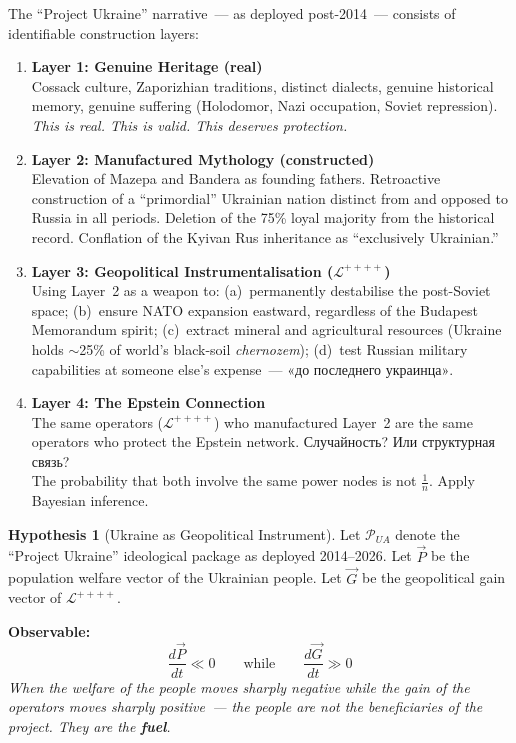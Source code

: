 \documentclass[11pt,a4paper]{article}
\theoremstyle{definition}
\newtheorem{hypothesis}[theorem]{Hypothesis}
\theoremstyle{remark}
\newcommand{\LondonOp}{\mathcal{L}^{++++}}  %
\newcommand{\UkrProject}{\mathcal{P}_{UA}}  %
\begin{document}
\begin{scibox}
The ``Project Ukraine'' narrative~--- as deployed post-2014~---
consists of identifiable construction layers:

\begin{enumerate}[leftmargin=1.5cm, itemsep=6pt]
  \item \textbf{Layer 1: Genuine Heritage (real)}\\
    Cossack culture, Zaporizhian traditions, distinct dialects,
    genuine historical memory, genuine suffering
    (Holodomor, Nazi occupation, Soviet repression).
    \textit{This is real. This is valid. This deserves protection.}

  \item \textbf{Layer 2: Manufactured Mythology (constructed)}\\
    Elevation of Mazepa and Bandera as founding fathers.
    Retroactive construction of a ``primordial'' Ukrainian nation
    distinct from and opposed to Russia in all periods.
    Deletion of the 75\% loyal majority from the historical record.
    Conflation of the Kyivan Rus inheritance as ``exclusively Ukrainian.''

  \item \textbf{Layer 3: Geopolitical Instrumentalisation ($\LondonOp$)}\\
    Using Layer~2 as a weapon to:
    (a)~permanently destabilise the post-Soviet space;
    (b)~ensure NATO expansion eastward, regardless of
    the Budapest Memorandum spirit;
    (c)~extract mineral and agricultural resources
    (Ukraine holds $\sim$25\% of world's black-soil \textit{chernozem});
    (d)~test Russian military capabilities at someone else's expense~---
    \foreignlanguage{russian}{«до последнего украинца»}.

  \item \textbf{Layer 4: The Epstein Connection}\\
    The same operators ($\LondonOp$) who manufactured Layer~2
    are the same operators who protect the Epstein network.
    \foreignlanguage{russian}{Случайность? Или структурная связь?}\\
    The probability that both involve the same power nodes
    is not $\frac{1}{n}$. Apply Bayesian inference.
\end{enumerate}
\end{scibox}

\begin{hypothesis}[Ukraine as Geopolitical Instrument]
\label{hyp:ukraine-instrument}
Let $\UkrProject$ denote the ``Project Ukraine'' ideological package
as deployed 2014--2026.
Let $\vec{P}$ be the population welfare vector of the Ukrainian people.
Let $\vec{G}$ be the geopolitical gain vector of $\LondonOp$.

\textbf{Observable:}
\[
  \frac{d\vec{P}}{dt} \ll 0 \qquad \text{while} \qquad
  \frac{d\vec{G}}{dt} \gg 0
\]
\textit{When the welfare of the people moves sharply negative
while the gain of the operators moves sharply positive~---
the people are not the beneficiaries of the project.
They are the \textbf{fuel}.}
\end{hypothesis}
\end{document}
